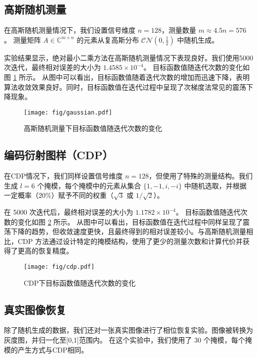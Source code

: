 \documentclass{article}
\begin{document}
\subsection{高斯随机测量}

在高斯随机测量情况下，我们设置信号维度 $n = 128$，测量数量 $m \approx 4.5n = 576$。
测量矩阵 $A \in\mathbb{C}^{m \times n}$ 的元素从复高斯分布 $\mathcal{CN}(0,
\frac{1}{2})$ 中随机生成。

实验结果显示，绝对最小二乘方法在高斯随机测量情况下表现良好。我们使用5000次迭代，最终相对误差的大小为 $1.4585\times 10^{-4}$。
目标函数值随迭代次数的变化如图 \ref{fig:gaussian} 所示。
从图中可以看出，目标函数值随着迭代次数的增加而迅速下降，表明算法收敛效果良好。同时，目标函数值在迭代过程中呈现了次梯度法常见的震荡下降现象。

\begin{figure}[h]
    \centering
    \texttt{[image: fig/gaussian.pdf]}
    \caption{高斯随机测量下目标函数值随迭代次数的变化}
    \label{fig:gaussian}
\end{figure}

\subsection{编码衍射图样（CDP）}

在CDP情况下，我们同样设置信号维度 $n = 128$，但使用了特殊的测量结构。我们生成 $l = 6$ 个掩模，每个掩模中的元素从集合
$\{1, -1, i, -i\}$ 中随机选取，并根据一定概率（$20\%$）赋予不同的权重（$\sqrt{3}$ 或 $1/\sqrt{2}$）。

在 5000 次迭代后，最终相对误差的大小为 $1.1782\times 10^{-4}$。
目标函数值随迭代次数的变化如图 \ref{fig:cdp} 所示。
从图中可以看出，目标函数值在迭代过程中同样呈现了震荡下降的趋势，但收敛速度更快，且最终得到的相对误差较小。与高斯随机测量相比，CDP
方法通过设计特定的掩模结构，使用了更少的测量次数和计算代价并获得了更高的恢复精度。
\begin{figure}[h]
    \centering
    \texttt{[image: fig/cdp.pdf]}
    \caption{CDP下目标函数值随迭代次数的变化}
    \label{fig:cdp}
\end{figure}

\subsection{真实图像恢复}

除了随机生成的数据，我们还对一张真实图像进行了相位恢复实验。图像被转换为灰度图，并归一化至[0,1]范围内。
在这个实验中，我们使用了 30 个掩模，每个掩模的产生方式与CDP相同。
\end{document}
